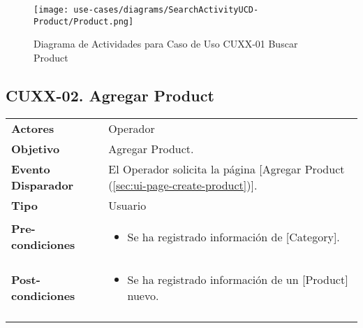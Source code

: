 	\begin{figure}[H]
		\begin{center}
			\label{tab:activity-search-ucd-entity-product}
			\texttt{[image: use-cases/diagrams/SearchActivityUCD-Product/Product.png]}
			\caption{Diagrama de Actividades para Caso de Uso CUXX-01 Buscar Product}
	\end{center}
	\end{figure}
	\clearpage
	\subsection{CUXX-02. Agregar Product} \label{sec:cu-create-Product}
	
	\begin{tabular}{ p{3.5cm} p{11.5cm} }
		\textbf{Actores} & Operador\\
		\textbf{Objetivo} & Agregar Product.\\
		\textbf{Evento Disparador} & El Operador solicita la p\'agina [Agregar Product (\ref{sec:ui-page-create-product})].\\
		\textbf{Tipo} & Usuario\\
		\textbf{Pre-condiciones} &
			\begin{minipage}[t]{0.6\textwidth}
			\begin{itemize}[noitemsep,nolistsep]
			\setlength{\itemindent}{-.5cm}
				\item Se ha registrado informaci\'on de [Category].
			\end{itemize}
			\end{minipage} \\
		\textbf{Post-condiciones} &
			\begin{minipage}[t]{0.6\textwidth}
			\begin{itemize}[noitemsep,nolistsep]
			\setlength{\itemindent}{-.5cm}
				\item Se ha registrado informaci\'on de un [Product] nuevo.
			\end{itemize}
			\end{minipage} \\
		\\
	\end{tabular}
	
